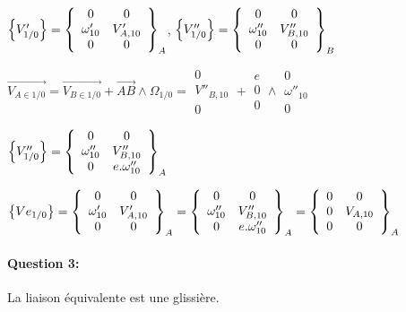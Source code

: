 $\left\{V'_{1/0}\right\}=\left\{\begin{array}{c c} 0 & 0\\ \omega'_{10} & V'_{A,10} \\ 0 & 0
\end{array} \right\}_A$,
$\left\{V''_{1/0}\right\}=\left\{\begin{array}{c c} 0 & 0\\ \omega''_{10} & V''_{B,10} \\ 0 & 0 \end{array} \right\}_B$

$\overrightarrow{V_{A\in1/0}}=\overrightarrow{V_{B\in1/0}}+\overrightarrow{AB}\wedge \Omega_{1/0}=\begin{array}{c} 0 \\ V''_{B,10} \\ 0 \end{array}+\begin{array}{c} e\\ 0 \\ 0 \end{array} \wedge \begin{array}{c} 0\\ \omega''_{10} \\ 0 \end{array}$

$\left\{V''_{1/0}\right\}=\left\{\begin{array}{c c} 0 & 0\\ \omega''_{10} & V''_{B,10} \\ 0 & e.\omega''_{10} \end{array} \right\}_A$

$\left\{Ve_{1/0}\right\}=\left\{\begin{array}{c c} 0 & 0\\ \omega'_{10} & V'_{A,10} \\ 0 & 0
\end{array} \right\}_A=\left\{\begin{array}{c c} 0 & 0\\ \omega''_{10} & V''_{B,10} \\ 0 & e.\omega''_{10} \end{array} \right\}_A=\left\{\begin{array}{c c} 0 & 0 \\ 0 & V_{A,10} \\ 0 & 0 \end{array} \right\}_A$

\paragraph{Question 3:} La liaison équivalente est une glissière.

